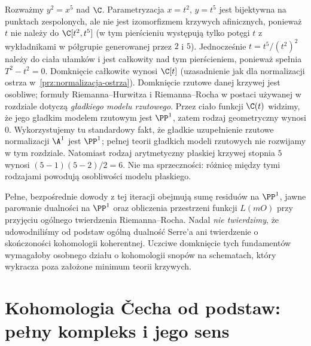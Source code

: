 \begin{przyklad}
Rozważmy $y^2=x^5$ nad $\C$.
Parametryzacja $x=t^2$, $y=t^5$ jest bijektywna
na punktach zespolonych, ale nie jest izomorfizmem
krzywych afinicznych, ponieważ $t$ nie należy do
$\C[t^2,t^5]$ (w tym pierścieniu występują tylko potęgi
$t$ z wykładnikami w półgrupie generowanej przez $2$ i $5$).
Jednocześnie $t=t^5/(t^2)^2$ należy do ciała ułamków i jest
całkowity nad tym pierścieniem, ponieważ spełnia
$T^2-t^2=0$. Domknięcie całkowite wynosi $\C[t]$
(uzasadnienie jak dla normalizacji ostrza w~\ref{prz:normalizacja-ostrza}).
Domknięcie rzutowe danej krzywej jest osobliwe;
formuły Riemanna--Hurwitza i Riemanna--Rocha
w postaci używanej w rozdziale dotyczą \emph{gładkiego
modelu rzutowego}. Przez ciało funkcji $\C(t)$ widzimy,
że jego gładkim modelem rzutowym jest $\PP^1$,
zatem rodzaj geometryczny wynosi $0$. Wykorzystujemy tu
standardowy fakt, że gładkie uzupełnienie rzutowe
normalizacji $\A^1$ jest $\PP^1$; pełnej teorii
gładkich modeli rzutowych nie rozwijamy w tym rozdziale.
Natomiast rodzaj arytmetyczny płaskiej krzywej
stopnia $5$ wynosi $(5-1)(5-2)/2=6$.
Nie ma sprzeczności: różnicę między tymi
rodzajami powodują osobliwości modelu płaskiego.
\end{przyklad}

\begin{uwaga}
Pełne, bezpośrednie dowody z tej iteracji obejmują
sumę residuów na $\PP^1$, jawne parowanie dualności
na $\PP^1$ oraz obliczenia przestrzeni funkcji
$L(mO)$ przy przyjęciu ogólnego twierdzenia
Riemanna--Rocha. Nadal \emph{nie twierdzimy}, że
udowodniliśmy od podstaw ogólną dualność Serre'a
ani twierdzenie o skończoności kohomologii koherentnej.
Uczciwe domknięcie tych fundamentów wymagałoby
osobnego działu o kohomologii snopów na schematach,
który wykracza poza założone minimum teorii krzywych.
\end{uwaga}

\section{Kohomologia Čecha od podstaw: pełny kompleks i jego sens}
\label{sec:cech-full}

